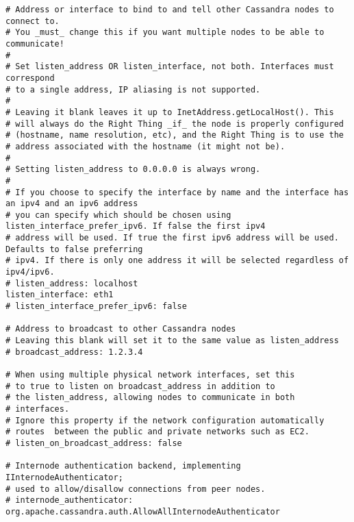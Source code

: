 \begin{verbatim}
# Address or interface to bind to and tell other Cassandra nodes to connect to.
# You _must_ change this if you want multiple nodes to be able to communicate!
#
# Set listen_address OR listen_interface, not both. Interfaces must correspond
# to a single address, IP aliasing is not supported.
#
# Leaving it blank leaves it up to InetAddress.getLocalHost(). This
# will always do the Right Thing _if_ the node is properly configured
# (hostname, name resolution, etc), and the Right Thing is to use the
# address associated with the hostname (it might not be).
#
# Setting listen_address to 0.0.0.0 is always wrong.
#
# If you choose to specify the interface by name and the interface has an ipv4 and an ipv6 address
# you can specify which should be chosen using listen_interface_prefer_ipv6. If false the first ipv4
# address will be used. If true the first ipv6 address will be used. Defaults to false preferring
# ipv4. If there is only one address it will be selected regardless of ipv4/ipv6.
# listen_address: localhost
listen_interface: eth1
# listen_interface_prefer_ipv6: false

# Address to broadcast to other Cassandra nodes
# Leaving this blank will set it to the same value as listen_address
# broadcast_address: 1.2.3.4

# When using multiple physical network interfaces, set this
# to true to listen on broadcast_address in addition to
# the listen_address, allowing nodes to communicate in both
# interfaces.
# Ignore this property if the network configuration automatically
# routes  between the public and private networks such as EC2.
# listen_on_broadcast_address: false

# Internode authentication backend, implementing IInternodeAuthenticator;
# used to allow/disallow connections from peer nodes.
# internode_authenticator: org.apache.cassandra.auth.AllowAllInternodeAuthenticator


\end{verbatim}
